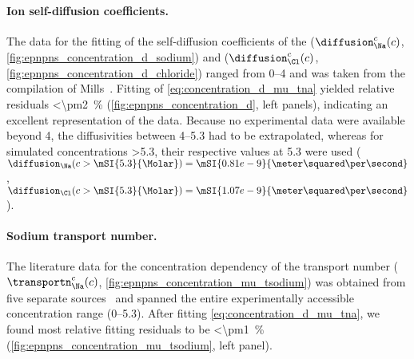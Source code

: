 \paragraph{Ion self-diffusion coefficients.}
%
The data for the fitting of the self-diffusion coefficients of the \Na{} ($\diffusion_{\Na}^c (c)$,
\cref{fig:epnpns_concentration_d_sodium}) and \Cl{} ($\diffusion_{\Cl}^c (c)$,
\cref{fig:epnpns_concentration_d_chloride}) ranged from \SIrange{0}{4}{\Molar} and was taken from the
compilation of Mills~\cite{Mills-1989}. Fitting of \cref{eq:concentration_d_mu_tna} yielded relative residuals
\SI{<\pm2}{\percent} (\cref{fig:epnpns_concentration_d}, left panels), indicating an excellent representation
of the data. Because no experimental data were available beyond \SI{4}{\Molar}, the diffusivities between
\SIrange{4}{5.3}{\Molar} had to be extrapolated, whereas for simulated concentrations \SI{>5.3}{\Molar}, their
respective values at \SI{5.3}{\Molar} were used (\ie~$\diffusion_{\Na} (c > \mSI{5.3}{\Molar}) =
\mSI{0.81e-9}{\meter\squared\per\second}$, $\diffusion_{\Cl} (c > \mSI{5.3}{\Molar}) =
\mSI{1.07e-9}{\meter\squared\per\second}$).

\paragraph{Sodium transport number.}
%
The literature data for the concentration dependency of the \Na{} transport number ($\transportn_{\Na}^c (c)$,
\cref{fig:epnpns_concentration_mu_tsodium}) was obtained from five separate
sources~\cite{Esteso-1976,Haynes-2017,DellaMonica-1979,Panopoulos-1986,Schonert-2013} and spanned the entire
experimentally accessible  concentration range (\SIrange{0}{5.3}{\Molar}). After fitting
\cref{eq:concentration_d_mu_tna}, we found most relative fitting residuals to be \SI{<\pm1}{\percent}
(\cref{fig:epnpns_concentration_mu_tsodium}, left panel).

